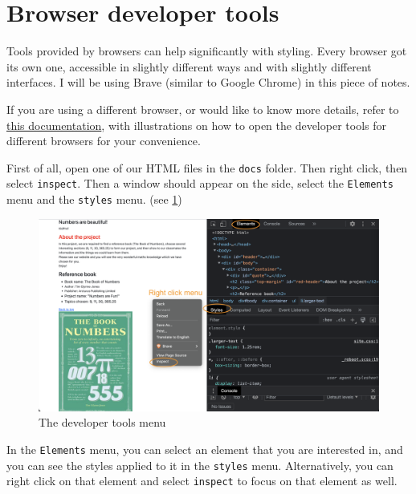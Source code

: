 \section{Browser developer tools} 

Tools provided by browsers can help significantly with styling. Every browser got its own one, accessible in  slightly different ways and with slightly different interfaces. I will be using Brave (similar to Google Chrome) in this piece of notes.

If you are using a different browser, or would like to know more details, refer to \href{https://www.hostinger.co.uk/tutorials/website/how-to-inspect-and-change-style-using-google-chrome}{this documentation}, with illustrations on how to open the developer tools for different browsers for your convenience.
\vspace{6mm}

First of all, open one of our HTML files in the \texttt{docs} folder. Then right click, then select \texttt{inspect}. Then a window should appear on the side, select the \texttt{Elements} menu and the \texttt{styles} menu. (see \cref{fig:devtools})

\begin{figure}[h]
\centering
\includegraphics[width=14cm]{images/chn6-devtools.png}
\caption{The developer tools menu}
\label{fig:devtools}
\end{figure}

In the \texttt{Elements} menu, you can select an element that you are interested in, and you can see the styles applied to it in the \texttt{styles} menu. Alternatively, you can right click on that element and select \texttt{inspect} to focus on that element as well.
\vspace{6mm}

